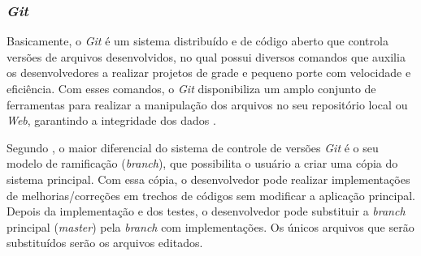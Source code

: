 \subsubsection{\textit{Git}}

Basicamente, o \textit{Git} é um sistema distribuído e de código aberto que controla versões de arquivos desenvolvidos, no qual possui diversos comandos que auxilia os desenvolvedores a realizar projetos de grade e pequeno porte com velocidade e eficiência.  Com esses comandos, o \textit{Git} disponibiliza um amplo conjunto de ferramentas para realizar a manipulação dos arquivos no seu repositório local ou \textit{Web}, garantindo a integridade dos dados \cite{GIT2010}.

Segundo , o maior diferencial do sistema de controle de versões \textit{Git} é o seu modelo de ramificação (\textit{branch}), que possibilita o usuário a criar uma cópia do sistema principal. Com essa cópia, o desenvolvedor pode realizar implementações de melhorias/correções em trechos de códigos sem modificar a aplicação principal. Depois da implementação e dos testes, o desenvolvedor pode substituir a \textit{branch} principal (\textit{master}) pela \textit{branch} com implementações. Os únicos arquivos que serão substituídos serão os arquivos editados.
